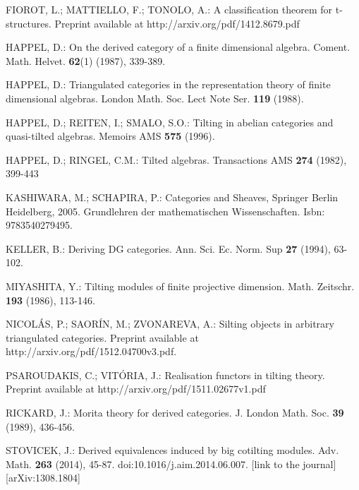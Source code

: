 \documentclass{proc-l}
\theoremstyle{definition}
\theoremstyle{remark}
\numberwithin{equation}{section}
\begin{document}
\begin{thebibliography}{99}
 {\sc FIOROT, L.; MATTIELLO, F.; TONOLO, A.}: A classification theorem for t-structures. Preprint available at http://arxiv.org/pdf/1412.8679.pdf

 {\sc HAPPEL, D.}: On the derived category of a finite dimensional algebra. Coment. Math. Helvet. \textbf{62}(1) (1987), 339-389.

 {\sc HAPPEL, D.}:  Triangulated categories in the representation theory of finite dimensional algebras. London Math. Soc. Lect Note Ser. \textbf{119} (1988). 

 {\sc HAPPEL, D.; REITEN, I.; SMALO, S.O.}: Tilting in abelian categories and quasi-tilted algebras. Memoirs AMS \textbf{575} (1996).

 {\sc HAPPEL, D.; RINGEL, C.M.}: Tilted algebras. Transactions AMS \textbf{274} (1982), 399-443 

 {\sc KASHIWARA, M.; SCHAPIRA, P.}: Categories and Sheaves, Springer Berlin Heidelberg, 2005. Grundlehren der mathematischen Wissenschaften. Isbn: 9783540279495.

 {\sc KELLER, B.}: Deriving DG categories. Ann. Sci. Ec. Norm. Sup \textbf{27} (1994), 63-102.


 {\sc MIYASHITA, Y.}: Tilting modules of finite projective dimension. Math. Zeitschr. \textbf{193} (1986), 113-146.

 {\sc NICOL\'AS, P.; SAOR\'IN, M.; ZVONAREVA, A.}: Silting objects in arbitrary triangulated categories. Preprint available at http://arxiv.org/pdf/1512.04700v3.pdf. 

 {\sc PSAROUDAKIS, C.; VIT\'ORIA, J.}: Realisation functors in tilting theory. Preprint available at http://arxiv.org/pdf/1511.02677v1.pdf

 {\sc RICKARD, J.}: Morita theory for derived categories. J. London Math. Soc. \textbf{39} (1989), 436-456.

 {\sc STOVICEK, J.}: Derived equivalences induced by big cotilting modules. Adv. Math. \textbf{263} (2014), 45-87. doi:10.1016/j.aim.2014.06.007. [link to the journal] [arXiv:1308.1804]



\end{thebibliography}
\end{document}
